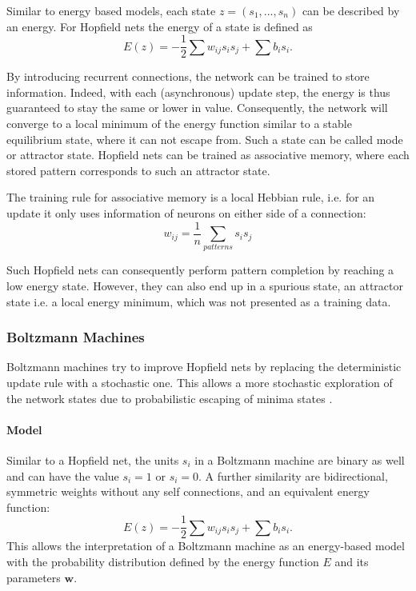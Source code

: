 Similar to energy based models, each state $z = (s_1, ... , s_n)$ can be described by an energy. 
For Hopfield nets the energy of a state is defined as  
\[
E(z) = - \frac{1}{2} \sum w_{ij} s_i s_j + \sum b_i s_i .
\]


By introducing recurrent connections, the network can be trained to store information.
Indeed, with each (asynchronous) update step, the energy is thus guaranteed to stay the same or lower in value.
Consequently, the network will converge to a local minimum of the energy function similar to a stable equilibrium state, where it can not escape from. 
Such a state can be called mode or attractor state.
Hopfield nets can be trained as associative memory, where each stored pattern corresponds to such an attractor state.

The training rule for associative memory is a local Hebbian rule, i.e. for an update it only uses information of neurons on either side of a connection:
\[
w_{ij} = \frac{1}{n} \sum_{patterns} s_{i} s_{j}
\]

Such Hopfield nets can consequently perform pattern completion by reaching a low energy state.
However, they can also end up in a spurious state, an attractor state i.e. a local energy minimum, which was not presented as a training data.


\subsubsection{Boltzmann Machines} \label{c:bms}

Boltzmann machines try to improve Hopfield nets by replacing the deterministic update rule with a stochastic one.
This allows a more stochastic exploration of the network states due to probabilistic escaping of minima states \cite{ackley1985learning}\cite{Goodfellow-et-al-2016-Book}.

\paragraph{Model} \label{c:bmmodel}

Similar to a Hopfield net, the units $s_i$ in a Boltzmann machine are binary as well and can have the value $s_i = 1$ or $s_i = 0$. 
A further similarity are bidirectional, symmetric weights without any self connections, and an equivalent energy function:
\[
	E(z) = - \frac{1}{2} \sum w_{ij} s_i s_j + \sum b_i s_i .
\]
This allows the interpretation of a Boltzmann machine as an energy-based model with the probability distribution defined by the energy function $E$ and its parameters $\textbf{w}$.

